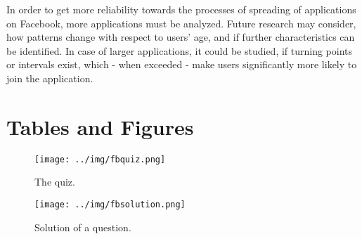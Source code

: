 \documentclass[preprint,12pt]{elsarticle}
\begin{document}
In order to get more reliability towards the processes of spreading
of applications on Facebook, more applications must be analyzed.
Future research may consider, how patterns change with respect
to users' age, and if further characteristics can be identified. In
case of larger applications, it could be studied, if turning points
or intervals exist, which - when exceeded - make users significantly
more likely to join the application.


















\newpage
\section{Tables and Figures}
\label{sec:addendum}

\begin{figure}
  \texttt{[image: ../img/fbquiz.png]}
 \caption{The quiz.}
\label{fig:quiz}
\end{figure}


\begin{figure}
  \texttt{[image: ../img/fbsolution.png]}
  \caption{Solution of a question.}
\label{fig:solution}
\end{figure}
\end{document}
